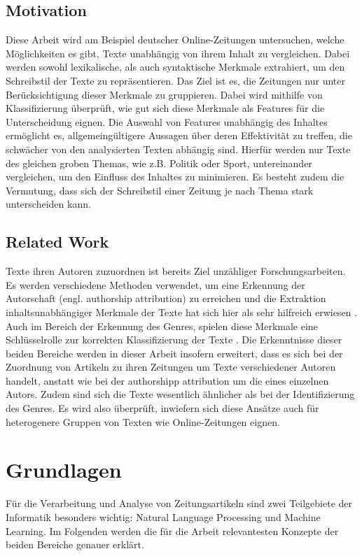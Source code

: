 \section{Motivation}
Diese Arbeit wird am Beispiel deutscher Online-Zeitungen untersuchen, welche Möglichkeiten es gibt, Texte unabhängig von ihrem Inhalt zu vergleichen. Dabei werden sowohl lexikalische, als auch syntaktische Merkmale extrahiert, um den Schreibstil der Texte zu repräsentieren. Das Ziel ist es, die Zeitungen nur unter Berücksichtigung dieser Merkmale zu gruppieren. Dabei wird mithilfe von Klassifizierung überprüft, wie gut sich diese Merkmale als Features für die Unterscheidung eignen. Die Auswahl von Features unabhängig des Inhaltes ermöglicht es, allgemeingültigere Aussagen über deren Effektivität zu treffen, die schwächer von den analysierten Texten abhängig sind. Hierfür werden nur Texte des gleichen groben Themas, wie z.B. Politik oder Sport, untereinander vergleichen, um den Einfluss des Inhaltes zu minimieren. Es besteht zudem die Vermutung, dass sich der Schreibstil einer Zeitung je nach Thema stark unterscheiden kann.

\section{Related Work}
Texte ihren Autoren zuzuordnen ist bereits Ziel unzähliger Forschungsarbeiten. Es werden verschiedene Methoden verwendet, um eine Erkennung der Autorschaft (engl. authorship attribution) zu erreichen und die Extraktion inhaltsunabhängiger Merkmale der Texte hat sich hier als sehr hilfreich erwiesen \cite{stamatatos2009survey}. Auch im Bereich der Erkennung des Genres, spielen diese Merkmale eine Schlüsselrolle zur korrekten Klassifizierung der Texte \cite{cimino2017identifying}. Die Erkenntnisse dieser beiden Bereiche werden in dieser Arbeit insofern erweitert, dass es sich bei der Zuordnung von Artikeln zu ihren Zeitungen um Texte verschiedener Autoren handelt, anstatt wie bei der authorshipp attribution um die eines einzelnen Autors. Zudem sind sich die Texte wesentlich ähnlicher als bei der Identifizierung des Genres. Es wird also überprüft, inwiefern sich diese Ansätze auch für heterogenere Gruppen von Texten wie Online-Zeitungen eignen.

\chapter{Grundlagen}
Für die Verarbeitung und Analyse von Zeitungsartikeln sind zwei Teilgebiete der Informatik besonders wichtig: Natural Language Processing und Machine Learning. Im Folgenden werden die für die Arbeit relevantesten Konzepte der beiden Bereiche genauer erklärt.


